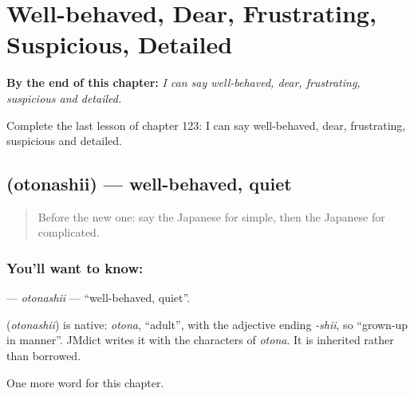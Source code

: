 
\chapter{Well-behaved, Dear, Frustrating, Suspicious, Detailed}
\label{ch:ja-well-behaved-dear-frustrating-suspicious-detailed}

\begin{chapteropening}
\textbf{By the end of this chapter:} \emph{I can say well-behaved, dear, frustrating, suspicious and detailed.}

Complete the last lesson of chapter 123: I can say well-behaved, dear, frustrating, suspicious and detailed.
\end{chapteropening}

\section[\texorpdfstring{\ja{おとなしい} (otonashii)}{おとなしい (otonashii)}]{ (otonashii) — well-behaved, quiet}

\label{lesson:JA-C123-otonashii}



\begin{quote}
Before the new one: say the Japanese for simple, then the Japanese for complicated.
\end{quote}

\subsection*{You'll want to know: }
\textbf{} — \emph{otonashii} — \textquotedblleft{}well-behaved, quiet\textquotedblright{}.

\begin{cousinweb}
\textbf{} (\emph{otonashii}) is native: \emph{otona}, \textquotedblleft{}adult\textquotedblright{}, with the adjective ending \emph{-shii}, so \textquotedblleft{}grown-up in manner\textquotedblright{}. JMdict writes it with the characters of \emph{otona}. It is inherited rather than borrowed.
\end{cousinweb}

\begin{grammarlens}[title={What you've built}]
One more word for this chapter.
\end{grammarlens}

